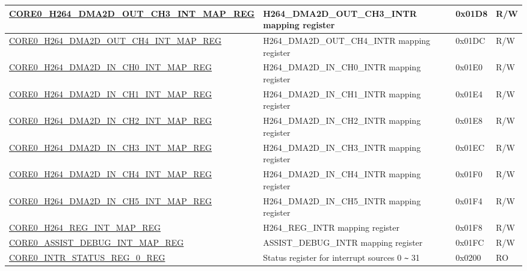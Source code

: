 \begin{longtable}{ | p{7.5cm} | p{7.2cm} | p{1.3cm} | p{1cm} | }
\hyperref[regdesc:CORE0H264DMA2DOUTCH3INTMAPREG]{CORE0\_H264\_DMA2D\_OUT\_CH3\_INT\_MAP\_REG} & H264\_DMA2D\_OUT\_CH3\_INTR mapping register & 0x01D8 & R/W \\ \hline

\hyperref[regdesc:CORE0H264DMA2DOUTCH4INTMAPREG]{CORE0\_H264\_DMA2D\_OUT\_CH4\_INT\_MAP\_REG} & H264\_DMA2D\_OUT\_CH4\_INTR mapping register & 0x01DC & R/W \\ \hline

\hyperref[regdesc:CORE0H264DMA2DINCH0INTMAPREG]{CORE0\_H264\_DMA2D\_IN\_CH0\_INT\_MAP\_REG} & H264\_DMA2D\_IN\_CH0\_INTR mapping register & 0x01E0 & R/W \\ \hline

\hyperref[regdesc:CORE0H264DMA2DINCH1INTMAPREG]{CORE0\_H264\_DMA2D\_IN\_CH1\_INT\_MAP\_REG} & H264\_DMA2D\_IN\_CH1\_INTR mapping register & 0x01E4 & R/W \\ \hline

\hyperref[regdesc:CORE0H264DMA2DINCH2INTMAPREG]{CORE0\_H264\_DMA2D\_IN\_CH2\_INT\_MAP\_REG} & H264\_DMA2D\_IN\_CH2\_INTR mapping register & 0x01E8 & R/W \\ \hline

\hyperref[regdesc:CORE0H264DMA2DINCH3INTMAPREG]{CORE0\_H264\_DMA2D\_IN\_CH3\_INT\_MAP\_REG} & H264\_DMA2D\_IN\_CH3\_INTR mapping register & 0x01EC & R/W \\ \hline

\hyperref[regdesc:CORE0H264DMA2DINCH4INTMAPREG]{CORE0\_H264\_DMA2D\_IN\_CH4\_INT\_MAP\_REG} & H264\_DMA2D\_IN\_CH4\_INTR mapping register & 0x01F0 & R/W \\ \hline

\hyperref[regdesc:CORE0H264DMA2DINCH5INTMAPREG]{CORE0\_H264\_DMA2D\_IN\_CH5\_INT\_MAP\_REG} & H264\_DMA2D\_IN\_CH5\_INTR mapping register & 0x01F4 & R/W \\ \hline

\hyperref[regdesc:CORE0H264REGINTMAPREG]{CORE0\_H264\_REG\_INT\_MAP\_REG} & H264\_REG\_INTR mapping register & 0x01F8 & R/W \\ \hline

\hyperref[regdesc:CORE0ASSISTDEBUGINTMAPREG]{CORE0\_ASSIST\_DEBUG\_INT\_MAP\_REG} & ASSIST\_DEBUG\_INTR mapping register & 0x01FC & R/W \\ \hline

\hyperref[regdesc:CORE0INTRSTATUSREG0REG]{CORE0\_INTR\_STATUS\_REG\_0\_REG} & Status register for interrupt sources 0 \verb+~+ 31  & 0x0200 & RO \\ \hline


\end{longtable}
